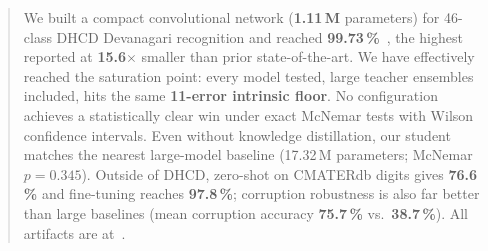 \begin{abstract}
We built a compact convolutional network (\textbf{1.11\,M} parameters) for 46-class
DHCD Devanagari recognition and reached \textbf{99.73\,\%}~\cite{acharya2015dhcd},
the highest reported at \textbf{15.6\(\times\)} smaller than prior state-of-the-art.
We have effectively reached the saturation point: every model tested, large teacher
ensembles included, hits the same \textbf{11-error intrinsic floor}.
No configuration achieves a statistically clear win under exact McNemar tests
with Wilson confidence intervals. Even without knowledge distillation, our student
matches the nearest large-model baseline (17.32\,M parameters; McNemar \(p=0.345\)).
Outside of DHCD, zero-shot on CMATERdb digits gives \textbf{76.6\,\%} and fine-tuning
reaches \textbf{97.8\,\%}; corruption robustness is also far better than large
baselines (mean corruption accuracy \textbf{75.7\,\%} vs.\ \textbf{38.7\,\%}).
All artifacts are at~\repourl.
\end{abstract}